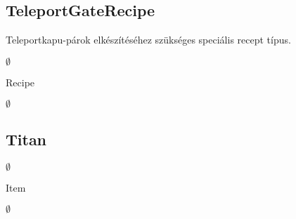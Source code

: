 \subsection{TeleportGateRecipe}
\begin{class-template-responsibility}
Teleportkapu-párok elkészítéséhez szükséges speciális recept típus. 
\end{class-template-responsibility}
\begin{class-template-interface}
$\emptyset$
\end{class-template-interface}
\begin{class-template-baseclass}
Recipe
\end{class-template-baseclass}
\begin{class-template-attribute}
\end{class-template-attribute}
\begin{class-template-method}
\item[] $\emptyset$
\end{class-template-method}


\subsection{Titan}
\begin{class-template-responsibility}

\end{class-template-responsibility}
\begin{class-template-interface}
$\emptyset$
\end{class-template-interface}
\begin{class-template-baseclass}
Item
\end{class-template-baseclass}
\begin{class-template-attribute}
\item[] $\emptyset$
\end{class-template-attribute}
\begin{class-template-method}
\end{class-template-method}


